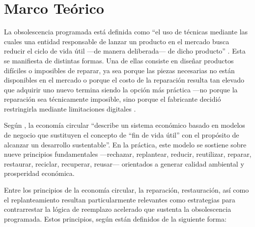 \section{Marco Teórico}

La obsolescencia programada está definida como “el uso de técnicas mediante las
cuales una entidad responsable de lanzar un producto en el mercado busca reducir
el ciclo de vida útil —de manera deliberada— de dicho producto”
\parencite[p.~741]{malinauskaite2021}. Esta se manifiesta de distintas formas.
Una de ellas consiste en diseñar productos difíciles o imposibles de reparar, ya
sea porque las piezas necesarias no están disponibles en el mercado o porque el
costo de la reparación resulta tan elevado que adquirir uno nuevo termina siendo
la opción más práctica —no porque la reparación sea técnicamente imposible, sino
porque el fabricante decidió restringirla mediante limitaciones digitales
\parencite[p.~105]{alfieri2023}.

Según \textcite[p.~225]{kirchherr2017}, la economía circular “describe un
sistema económico basado en modelos de negocio que sustituyen el concepto de
``fin de vida útil'' con el propósito de alcanzar un desarrollo sustentable”. En
la práctica, este modelo se sostiene sobre nueve principios fundamentales
—rechazar, replantear, reducir, reutilizar, reparar, restaurar, reciclar,
recuperar, reusar— orientados a generar calidad ambiental y prosperidad
económica.

Entre los principios de la economía circular, la reparación, restauración, así
como el replanteamiento resultan particularmente relevantes como estrategias
para contrarrestar la lógica de reemplazo acelerado que sustenta la
obsolescencia programada. Estos principios, según
\textcite[pp.~29-31]{lambiase2024} están definidos de la siguiente forma:  

